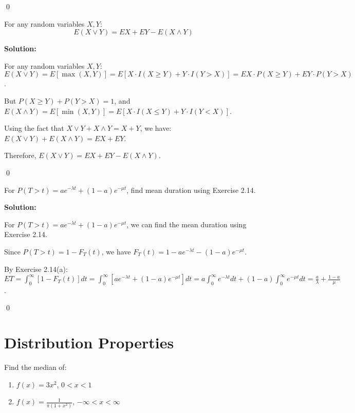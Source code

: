 \qed
\begin{problembox}
For any random variables $X,Y$:
\[ E(X\lor Y) = EX + EY - E(X\land Y) \]
\end{problembox}

\noindent\textbf{Solution:}

For any random variables $X,Y$:
$E(X\lor Y) = E[\max(X,Y)] = E[X \cdot I(X \geq Y) + Y \cdot I(Y > X)] = EX \cdot P(X \geq Y) + EY \cdot P(Y > X)$.

But $P(X \geq Y) + P(Y > X) = 1$, and $E(X\land Y) = E[\min(X,Y)] = E[X \cdot I(X \leq Y) + Y \cdot I(Y < X)]$.

Using the fact that $X\lor Y + X\land Y = X + Y$, we have:
$E(X\lor Y) + E(X\land Y) = EX + EY$.

Therefore, $E(X\lor Y) = EX + EY - E(X\land Y)$.


\qed
\begin{problembox}
For $P(T>t) = ae^{-\lambda t} + (1-a)e^{-\mu t}$, find mean duration using Exercise 2.14.
\end{problembox}

\noindent\textbf{Solution:}

For $P(T>t) = ae^{-\lambda t} + (1-a)e^{-\mu t}$, we can find the mean duration using Exercise 2.14.

Since $P(T>t) = 1 - F_T(t)$, we have $F_T(t) = 1 - ae^{-\lambda t} - (1-a)e^{-\mu t}$.

By Exercise 2.14(a): $ET = \int_0^\infty [1-F_T(t)]dt = \int_0^\infty [ae^{-\lambda t} + (1-a)e^{-\mu t}]dt = a\int_0^\infty e^{-\lambda t}dt + (1-a)\int_0^\infty e^{-\mu t}dt = \frac{a}{\lambda} + \frac{1-a}{\mu}$.


\qed
\section{Distribution Properties}

\begin{problembox}
Find the median of:
\begin{enumerate}[label=(\alph*)]
    \item $f(x)=3x^2$, $0<x<1$
    \item $f(x)=\frac{1}{\pi(1+x^2)}$, $-\infty<x<\infty$
\end{enumerate}
\end{problembox}

